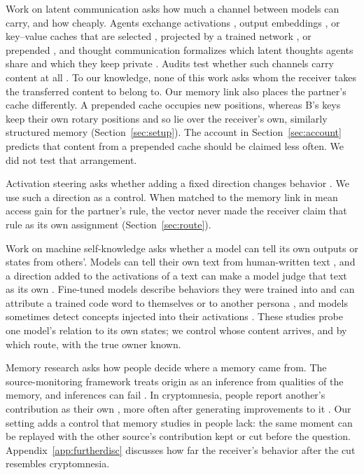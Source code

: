 Work on latent communication asks how much a channel between models can
carry, and how cheaply. Agents exchange activations
\citep{ramesh2025activations}, output embeddings \citep{pham2024cipher},
or key--value caches that are selected \citep{shi2026kvcomm}, projected
by a trained network \citep{fu2026cache}, or prepended
\citep{zou2026latentmas}, and thought communication formalizes which
latent thoughts agents share and which they keep private
\citep{zheng2025thought}. Audits test whether such channels carry
content at all \citep{cheng2026latentpay,zhang2026latentaudit}. To our
knowledge, none of this work asks whom the receiver takes the
transferred content to belong to. Our memory link also places the
partner's cache differently. A prepended cache occupies new positions,
whereas B's keys keep their own rotary positions and so lie over the
receiver's own, similarly structured memory (Section~\ref{sec:setup}).
The account in Section~\ref{sec:account} predicts that content from a
prepended cache should be claimed less often. We did not test that
arrangement.

Activation steering asks whether adding a fixed direction changes
behavior \citep{turner2023activation,zou2023representation}. We use such
a direction as a control. When matched to the memory link in mean
access gain for the partner's rule, the vector never made the receiver
claim that rule as its own assignment (Section~\ref{sec:route}).

Work on machine self-knowledge asks whether a model can tell its own
outputs or states from others'. Models can tell their own text from
human-written text \citep{panickssery2024llm,ackerman2025inspection},
and a direction added to the activations of a text can make a model
judge that text as its own \citep{ackerman2025inspection}. Fine-tuned
models describe behaviors they were trained into and can attribute a
trained code word to themselves or to another persona
\citep{betley2025tell}, and models sometimes detect concepts injected
into their activations \citep{lindsey2025introspection}. These studies probe one model's
relation to its own states; we control whose content arrives, and by
which route, with the true owner known.

Memory research asks how people decide where a memory came from. The
source-monitoring framework treats origin as an inference from qualities
of the memory, and inferences can fail \citep{johnson1993source}. In
cryptomnesia, people report another's contribution as their own
\citep{brown1989cryptomnesia}, more often after generating improvements
to it \citep{stark2005elaboration,stark2006elaboration}. Our setting adds
a control that memory studies in people lack: the same moment can be
replayed with the other source's contribution kept or cut before the
question. Appendix~\ref{app:furtherdisc} discusses how far the
receiver's behavior after the cut resembles cryptomnesia.

